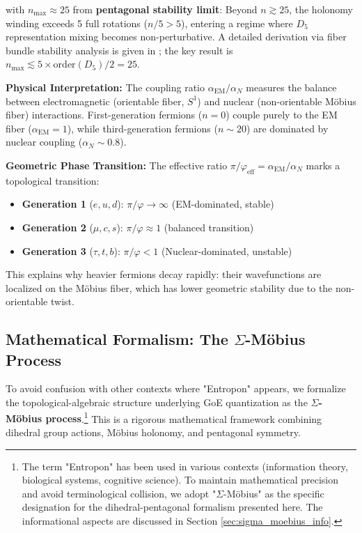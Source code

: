 \documentclass[12pt]{article}
\begin{document}
with $n_{\max} \approx 25$ from \textbf{pentagonal stability limit}: Beyond $n \gtrsim 25$, the holonomy winding exceeds 5 full rotations ($n/5 > 5$), entering a regime where $D_5$ representation mixing becomes non-perturbative. A detailed derivation via fiber bundle stability analysis is given in \cite{goe_protocol_2025}; the key result is $n_{\max} \lesssim 5 \times \text{order}(D_5) / 2 = 25$.

\textbf{Physical Interpretation:} The coupling ratio $\alpha_{\text{EM}}/\alpha_N$ measures the balance between electromagnetic (orientable fiber, $S^1$) and nuclear (non-orientable M\"obius fiber) interactions. First-generation fermions ($n=0$) couple purely to the EM fiber ($\alpha_{\text{EM}} = 1$), while third-generation fermions ($n \sim 20$) are dominated by nuclear coupling ($\alpha_N \sim 0.8$).

\textbf{Geometric Phase Transition:} The effective ratio $\pi/\varphi_{\text{eff}} = \alpha_{\text{EM}}/\alpha_N$ marks a topological transition:

\begin{itemize}
\item \textbf{Generation 1} ($e, u, d$): $\pi/\varphi \to \infty$ (EM-dominated, stable)
\item \textbf{Generation 2} ($\mu, c, s$): $\pi/\varphi \approx 1$ (balanced transition)
\item \textbf{Generation 3} ($\tau, t, b$): $\pi/\varphi < 1$ (Nuclear-dominated, unstable)
\end{itemize}

This explains why heavier fermions decay rapidly: their wavefunctions are localized on the M\"obius fiber, which has lower geometric stability due to the non-orientable twist.

\subsection{Mathematical Formalism: The $\Sigma$-M\"obius Process}
\label{sec:sigma_moebius}

To avoid confusion with other contexts where "Entropon" appears, we formalize the topological-algebraic structure underlying GoE quantization as the \textbf{$\Sigma$-M\"obius process}.\footnote{The term "Entropon" has been used in various contexts (information theory, biological systems, cognitive science). To maintain mathematical precision and avoid terminological collision, we adopt "$\Sigma$-M\"obius" as the specific designation for the dihedral-pentagonal formalism presented here. The informational aspects are discussed in Section \ref{sec:sigma_moebius_info}.} This is a rigorous mathematical framework combining dihedral group actions, M\"obius holonomy, and pentagonal symmetry.
\end{document}
